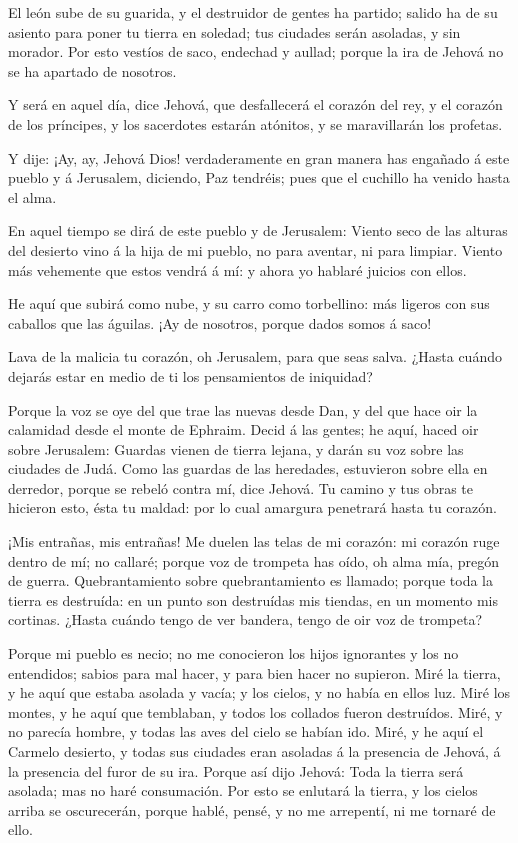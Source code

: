  El león sube de su guarida, y el destruidor de gentes ha
partido; salido ha de su asiento para poner tu tierra en soledad; tus
ciudades serán asoladas, y sin morador.  Por esto vestíos de
saco, endechad y aullad; porque la ira de Jehová no se ha apartado de
nosotros.

 Y será en aquel día, dice Jehová, que desfallecerá el
corazón del rey, y el corazón de los príncipes, y los sacerdotes estarán
atónitos, y se maravillarán los profetas.

 Y dije: ¡Ay, ay, Jehová Dios! verdaderamente en gran
manera has engañado á este pueblo y á Jerusalem, diciendo, Paz tendréis;
pues que el cuchillo ha venido hasta el alma.

 En aquel tiempo se dirá de este pueblo y de Jerusalem:
Viento seco de las alturas del desierto vino á la hija de mi pueblo, no
para aventar, ni para limpiar.  Viento más vehemente que
estos vendrá á mí: y ahora yo hablaré juicios con ellos.

 He aquí que subirá como nube, y su carro como torbellino:
más ligeros con sus caballos que las águilas. ¡Ay de nosotros, porque
dados somos á saco!

 Lava de la malicia tu corazón, oh Jerusalem, para que seas
salva. ¿Hasta cuándo dejarás estar en medio de ti los pensamientos de
iniquidad?

 Porque la voz se oye del que trae las nuevas desde Dan, y
del que hace oir la calamidad desde el monte de Ephraim. 
Decid á las gentes; he aquí, haced oir sobre Jerusalem: Guardas vienen
de tierra lejana, y darán su voz sobre las ciudades de Judá.
 Como las guardas de las heredades, estuvieron sobre ella
en derredor, porque se rebeló contra mí, dice Jehová.  Tu
camino y tus obras te hicieron esto, ésta tu maldad: por lo cual
amargura penetrará hasta tu corazón.

 ¡Mis entrañas, mis entrañas! Me duelen las telas de mi
corazón: mi corazón ruge dentro de mí; no callaré; porque voz de
trompeta has oído, oh alma mía, pregón de guerra. 
Quebrantamiento sobre quebrantamiento es llamado; porque toda la tierra
es destruída: en un punto son destruídas mis tiendas, en un momento mis
cortinas.  ¿Hasta cuándo tengo de ver bandera, tengo de oir
voz de trompeta?

 Porque mi pueblo es necio; no me conocieron los hijos
ignorantes y los no entendidos; sabios para mal hacer, y para bien hacer
no supieron.  Miré la tierra, y he aquí que estaba asolada
y vacía; y los cielos, y no había en ellos luz.  Miré los
montes, y he aquí que temblaban, y todos los collados fueron destruídos.
 Miré, y no parecía hombre, y todas las aves del cielo se
habían ido.  Miré, y he aquí el Carmelo desierto, y todas
sus ciudades eran asoladas á la presencia de Jehová, á la presencia del
furor de su ira.  Porque así dijo Jehová: Toda la tierra
será asolada; mas no haré consumación.  Por esto se
enlutará la tierra, y los cielos arriba se oscurecerán, porque hablé,
pensé, y no me arrepentí, ni me tornaré de ello.

